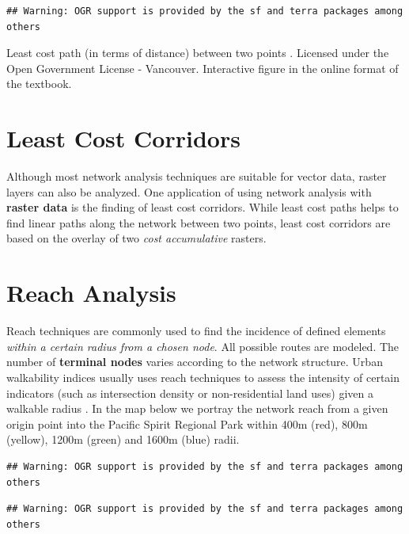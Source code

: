 \documentclass[
]{book}
\begin{document}
\begin{verbatim}
## Warning: OGR support is provided by the sf and terra packages among others
\end{verbatim}

\label{fig:8-least-cost-path}Least cost path (in terms of distance) between two points \citep{city_of_vancouver_open_nodate}. Licensed under the Open Government License - Vancouver. Interactive figure in the online format of the textbook.

\hypertarget{least-cost-corridors}{%
\section{Least Cost Corridors}\label{least-cost-corridors}}

Although most network analysis techniques are suitable for vector data, raster layers can also be analyzed. One application of using network analysis with \textbf{raster data} is the finding of least cost corridors. While least cost paths helps to find linear paths along the network between two points, least cost corridors are based on the overlay of two \emph{cost accumulative} rasters.

\hypertarget{reach-analysis}{%
\section{Reach Analysis}\label{reach-analysis}}

Reach techniques are commonly used to find the incidence of defined elements \emph{within a certain radius from a chosen node}. All possible routes are modeled. The number of \textbf{terminal nodes} varies according to the network structure. Urban walkability indices usually uses reach techniques to assess the intensity of certain indicators (such as intersection density or non-residential land uses) given a walkable radius \citep{martino_spatial_2020}. In the map below we portray the network reach from a given origin point into the Pacific Spirit Regional Park within 400m (red), 800m (yellow), 1200m (green) and 1600m (blue) radii.

\begin{verbatim}
## Warning: OGR support is provided by the sf and terra packages among others
\end{verbatim}

\begin{verbatim}
## Warning: OGR support is provided by the sf and terra packages among others
\end{verbatim}
\end{document}
